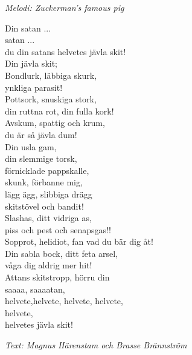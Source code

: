 {\footnotesize\textit{Melodi: Zuckerman's famous pig}}\par
\vspace{10pt}
Din satan ...\\
satan ...\\
du din satans helvetes jävla skit!\\
Din jävla skit;\\
Bondlurk, läbbiga skurk,\\
ynkliga parasit!\\
Pottsork, snuskiga stork,\\
din ruttna rot, din fulla kork!\\
Avskum, spattig och krum, \\
du är så jävla dum!\\
Din usla gam,\\
din slemmige torsk,\\
förnicklade pappskalle,\\
skunk, förbanne mig,\\
lägg ägg, slibbiga drägg\\
skitstövel och bandit!\\
Slashas, ditt vidriga as,\\
piss och pest och senapsgas!!\\
Sopprot, helidiot, fan vad du bär dig åt!\\
Din sabla bock, ditt feta arsel,\\
våga dig aldrig mer hit!\\
Attans skitstropp, hörru din\\
saaaa, saaaatan,\\
helvete,helvete, helvete, helvete,\\
helvete,\\
helvetes jävla skit!\par
\vspace{10pt}
{\footnotesize\textit{Text: Magnus Härenstam och Brasse Brännström}}
